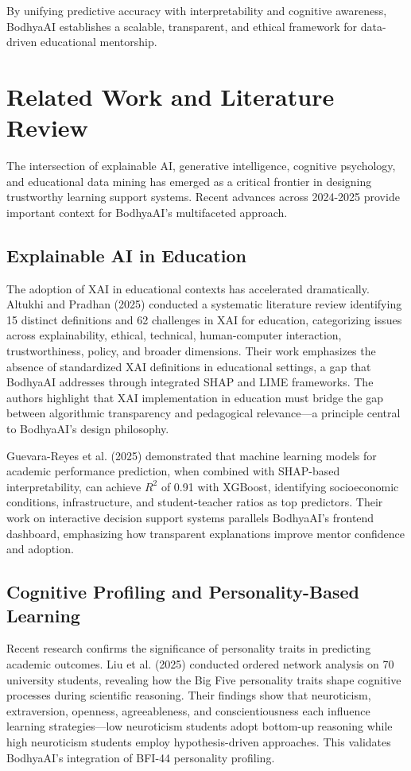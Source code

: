 \documentclass[conference]{IEEEtran}
\begin{document}
By unifying predictive accuracy with interpretability and cognitive awareness, BodhyaAI establishes a scalable, transparent, and ethical framework for data-driven educational mentorship.

\section{Related Work and Literature Review}

The intersection of explainable AI, generative intelligence, cognitive psychology, and educational data mining has emerged as a critical frontier in designing trustworthy learning support systems. Recent advances across 2024-2025 provide important context for BodhyaAI's multifaceted approach.

\subsection{Explainable AI in Education}
The adoption of XAI in educational contexts has accelerated dramatically. Altukhi and Pradhan (2025) conducted a systematic literature review identifying 15 distinct definitions and 62 challenges in XAI for education, categorizing issues across explainability, ethical, technical, human-computer interaction, trustworthiness, policy, and broader dimensions. Their work emphasizes the absence of standardized XAI definitions in educational settings, a gap that BodhyaAI addresses through integrated SHAP and LIME frameworks. The authors highlight that XAI implementation in education must bridge the gap between algorithmic transparency and pedagogical relevance—a principle central to BodhyaAI's design philosophy.

Guevara-Reyes et al. (2025) demonstrated that machine learning models for academic performance prediction, when combined with SHAP-based interpretability, can achieve \(R^2\) of 0.91 with XGBoost, identifying socioeconomic conditions, infrastructure, and student-teacher ratios as top predictors. Their work on interactive decision support systems parallels BodhyaAI's frontend dashboard, emphasizing how transparent explanations improve mentor confidence and adoption.

\subsection{Cognitive Profiling and Personality-Based Learning}
Recent research confirms the significance of personality traits in predicting academic outcomes. Liu et al. (2025) conducted ordered network analysis on 70 university students, revealing how the Big Five personality traits shape cognitive processes during scientific reasoning. Their findings show that neuroticism, extraversion, openness, agreeableness, and conscientiousness each influence learning strategies—low neuroticism students adopt bottom-up reasoning while high neuroticism students employ hypothesis-driven approaches. This validates BodhyaAI's integration of BFI-44 personality profiling.
\end{document}
